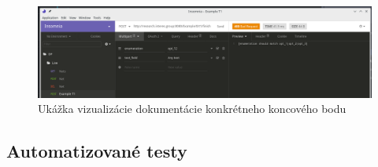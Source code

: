 \begin{figure}[!htbp]
	\centering
	\includegraphics[width=16cm]{img/insomnia_400.png}
    \caption{Ukážka vizualizácie dokumentácie konkrétneho koncového bodu}
	\label{insomnia_400}
\end{figure}

\subsection{Automatizované testy}

